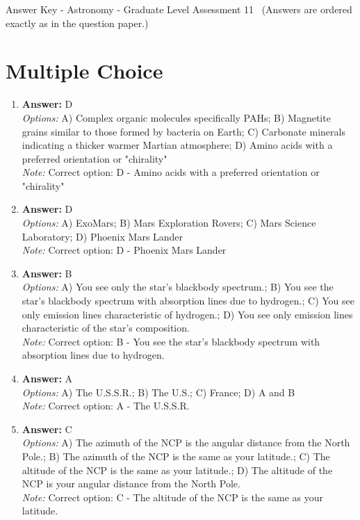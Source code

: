 \documentclass[12pt]{article}
\begin{document}
\begin{center}
Answer Key - Astronomy - Graduate Level Assessment 11 \
\small (Answers are ordered exactly as in the question paper.)
\end{center}

\section*{Multiple Choice}
\begin{enumerate}[label=\arabic*.]
\item \textbf{Answer:} D
\\ \textit{Options:} A) Complex organic molecules specifically PAHs; B) Magnetite grains similar to those formed by bacteria on Earth; C) Carbonate minerals indicating a thicker warmer Martian atmosphere; D) Amino acids with a preferred orientation or "chirality"
\\ \textit{Note:} Correct option: D - Amino acids with a preferred orientation or "chirality"
\item \textbf{Answer:} D
\\ \textit{Options:} A) ExoMars; B) Mars Exploration Rovers; C) Mars Science Laboratory; D) Phoenix Mars Lander
\\ \textit{Note:} Correct option: D - Phoenix Mars Lander
\item \textbf{Answer:} B
\\ \textit{Options:} A) You see only the star's blackbody spectrum.; B) You see the star's blackbody spectrum with absorption lines due to hydrogen.; C) You see only emission lines characteristic of hydrogen.; D) You see only emission lines characteristic of the star's composition.
\\ \textit{Note:} Correct option: B - You see the star's blackbody spectrum with absorption lines due to hydrogen.
\item \textbf{Answer:} A
\\ \textit{Options:} A) The U.S.S.R.; B) The U.S.; C) France; D) A and B
\\ \textit{Note:} Correct option: A - The U.S.S.R.
\item \textbf{Answer:} C
\\ \textit{Options:} A) The azimuth of the NCP is the angular distance from the North Pole.; B) The azimuth of the NCP is the same as your latitude.; C) The altitude of the NCP is the same as your latitude.; D) The altitude of the NCP is your angular distance from the North Pole.
\\ \textit{Note:} Correct option: C - The altitude of the NCP is the same as your latitude.
\end{enumerate}
\end{document}
